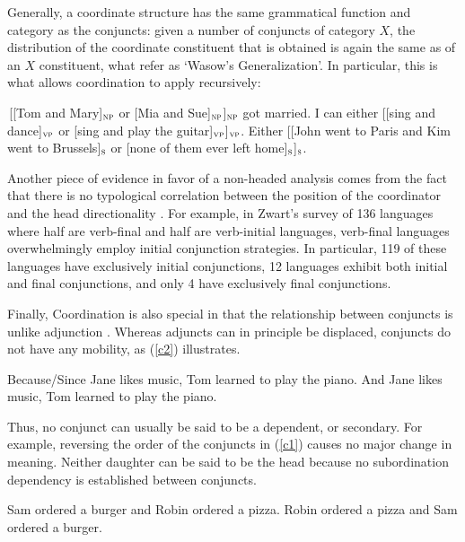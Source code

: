 \documentclass[output=paper]{langsci/langscibook}
\newcommand{\subl}[1]{$_{\small \textsc{#1}}$}
\begin{document}
Generally, a coordinate structure has the same grammatical function and category as the conjuncts: given a number of
conjuncts of category $X$, the distribution of the coordinate constituent that is obtained is again the same
as of an $X$ constituent, what \citet{pullumzwicky} refer as `Wasow's Generalization'.
In particular, this is what allows coordination to apply recursively:

\begin{exe}
\ex
\begin{xlista}
\ex \,[[Tom and Mary]\subl{np} or [Mia and Sue]\subl{np}]\subl{np} got married.
\ex I can either [[sing and dance]\subl{vp} or [sing and play the guitar]\subl{vp}]\subl{vp}.
\ex Either [[John went to Paris and Kim went to Brussels]\subl{s} or
[none of them ever left home]\subl{s}]\subl{s}.
\end{xlista}
\end{exe}

Another piece of evidence in favor of a non-headed analysis comes from the fact that there is no typological correlation between the position of the coordinator and the head directionality \citet{zwart}. For example, in Zwart's  survey of 136 languages where half are verb-final and half
are verb-initial languages,  verb-final languages overwhelmingly employ initial conjunction strategies.
In particular, 119 of these languages have exclusively initial conjunctions, 12 languages exhibit both initial
and final conjunctions, and only 4 have exclusively final conjunctions. 


Finally, Coordination is also special in that the relationship between conjuncts is unlike adjunction \citep{levinepostal}.
Whereas adjuncts can in principle be displaced, conjuncts do not have any mobility, as (\ref{c2}) illustrates.

\begin{exe}
\ex
\begin{xlista}
\ex Because/Since Jane likes music, Tom learned to play the piano.
\ex *And Jane likes music, Tom learned to play the piano.
\end{xlista}\label{c2}
\end{exe}


\noindent
Thus, no conjunct can usually be said to be a dependent, or secondary. For example,  reversing the order of the conjuncts in (\ref{c1}) causes no major change in meaning. Neither daughter can be said to be the head because no subordination dependency is established between conjuncts.

\begin{exe}
\ex
\begin{xlista}
\ex Sam ordered a burger and Robin ordered a pizza.
\ex Robin ordered a pizza and Sam ordered a burger.
\end{xlista}\label{c1}
\end{exe}
\end{document}
